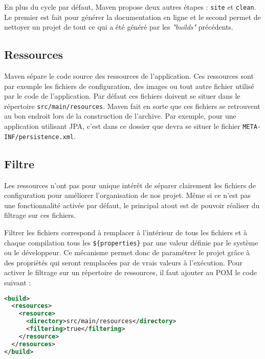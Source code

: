 \documentclass[a4paper,11pt]{article}
\begin{document}
En plus du cycle par défaut, Maven propose deux autres étapes : \texttt{site} et \texttt{clean}. Le premier est 
fait pour générer la documentation en ligne et le second permet de nettoyer un projet de tout ce qui a été généré par les 
\emph{"builds"} précédents.

\subsection{Ressources}
Maven sépare le code source des ressources de l'application. Ces ressources sont par exemple les fichiers de configuration, 
des images ou tout autre fichier utilisé par le code de l'application. Par défaut ces fichiers doivent se situer dans le 
répertoire \texttt{src/main/resources}. Maven fait en sorte que ces fichiers se retrouvent au bon endroit lors de la 
construction de l'archive. Par exemple, pour une application utilisant JPA, c'est dans ce dossier que devra se situer 
le fichier \texttt{META-INF/persistence.xml}.

\subsection{Filtre}
Les ressources n'ont pas pour unique intérêt de séparer clairement les fichiers de configuration pour améliorer 
l'organisation de nos projet. Même si ce n'est pas une fonctionnalité activée par défaut, le principal atout est 
de pouvoir réaliser du filtrage sur ces fichiers. 

Filtrer les fichiers correspond à remplacer à l'intérieur de tous les fichiers et à chaque compilation tous les 
\texttt{\$\{properties\}} par une valeur définie par le système ou le développeur. Ce mécanisme permet donc de paramétrer 
le projet grâce à des propriétés qui seront remplacées par de vrais valeurs à l'exécution. Pour activer le filtrage sur un 
répertoire de ressources, il faut ajouter au POM le code suivant : 
\begin{lstlisting}[language=XML]
<build>
  <resources>
    <resource>
      <directory>src/main/resources</directory>
      <filtering>true</filtering>
    </resource>
  </resources>
</build>
\end{lstlisting}
\end{document}

